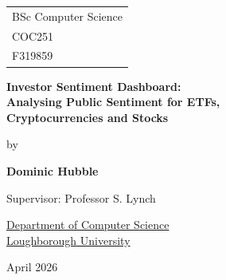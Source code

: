 \documentclass[a4paper]{report}
\begin{document}

\thispagestyle{empty}          %
\fancypage{}{\fbox}            %

\begin{center}

\Large{
\hfill \begin{tabular}{l}
BSc Computer Science \\
COC251 \\
F319859 \\
\end{tabular}
}

\vspace*{\fill}

\Large{\textbf{Investor Sentiment Dashboard: \\ 
Analysing Public Sentiment for ETFs, \\ 
Cryptocurrencies and Stocks}}

\vspace*{\fill}

by

\vspace*{\fill}

\textbf{Dominic Hubble}

\vspace*{\fill}

Supervisor: Professor S. Lynch

\vspace*{\fill}

\underline{Department of Computer Science} \\
\underline{Loughborough University}

\vspace*{\fill}

April 2026

\end{center}

\newpage
\fancypage{}{}  %





\end{document}
